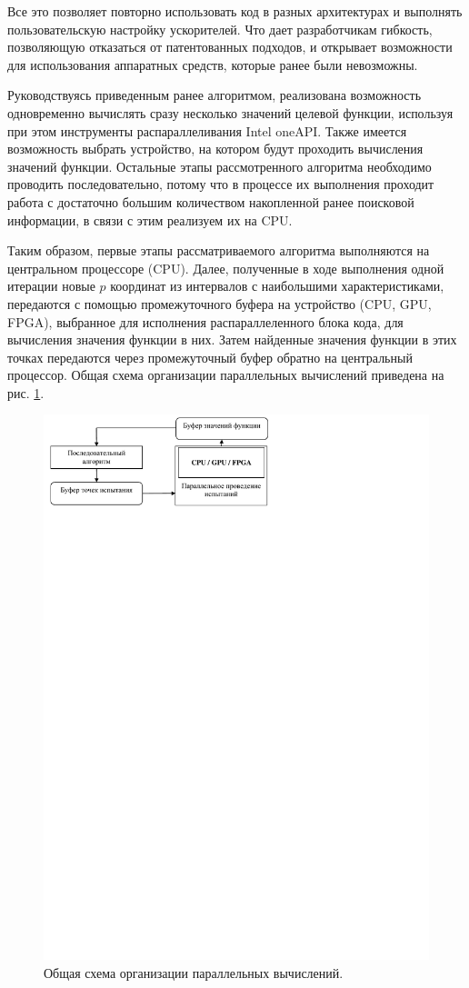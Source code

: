 \documentclass[10pt,a4paper]{book}
\begin{document}
Все это позволяет повторно использовать код в разных архитектурах и выполнять пользовательскую настройку ускорителей. Что дает разработчикам гибкость, позволяющую отказаться от патентованных подходов, и открывает возможности для использования аппаратных средств, которые ранее были невозможны.

Руководствуясь приведенным ранее алгоритмом, реализована возможность одновременно вычислять сразу несколько значений целевой функции, используя при этом инструменты распараллеливания Intel oneAPI. Также имеется возможность выбрать устройство, на котором будут проходить вычисления значений функции. Остальные этапы рассмотренного алгоритма необходимо проводить последовательно, потому что в процессе их выполнения проходит работа с достаточно большим количеством накопленной ранее поисковой информации, в связи с этим реализуем их на CPU. 

Таким образом, первые этапы рассматриваемого алгоритма выполняются на центральном процессоре (CPU). Далее, полученные в ходе выполнения одной итерации новые $p$ координат из интервалов с наибольшими характеристиками, передаются с помощью промежуточного буфера на устройство (CPU, GPU, FPGA), выбранное для исполнения распараллеленного блока кода, для вычисления значения функции в них. Затем найденные значения функции в этих точках передаются через промежуточный буфер обратно на центральный процессор. Общая схема организации параллельных вычислений приведена на рис. \ref{fig:s1}.


\begin{figure}
\begin{center}
  \includegraphics[width=0.7\linewidth]{./pic/s1.pdf}
  \caption{Общая схема организации параллельных вычислений.}
  \label{fig:s1}  
\end{center}
\end{figure}
\end{document}
